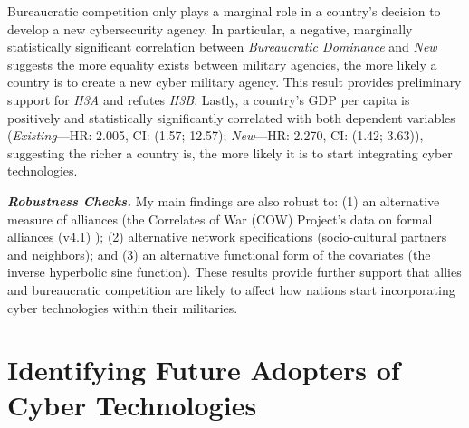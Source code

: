 \documentclass[12pt, letterpaper]{article}
\theoremstyle{plain}
\theoremstyle{remark}
\begin{document}


Bureaucratic competition only plays a marginal role in a country's decision to develop a new cybersecurity agency.
In particular, a negative, marginally statistically significant correlation between \textit{Bureaucratic Dominance} and \textit{New} suggests the more equality exists between military agencies, the more likely a country is to create a new cyber military agency. This result provides preliminary support for \textit{H3A} and refutes \textit{H3B}. 
Lastly, a country's GDP per capita is positively and statistically significantly correlated with both dependent variables (\textit{Existing}---HR: 2.005, CI: (1.57; 12.57); \textit{New}---HR: 2.270, CI: (1.42; 3.63)), suggesting the richer a country is, the more likely it is to start integrating cyber technologies. 


\vspace{3mm}

\noindent
\textbf{\textit{Robustness Checks.}}
My main findings are also robust to:
(1) an alternative measure of alliances (the Correlates of War (COW) Project's data on formal alliances (v4.1) \citep{gibler2008international}); 
(2) alternative network specifications (socio-cultural partners and neighbors); and 
(3) an alternative functional form of the covariates (the inverse hyperbolic sine function). 
These results provide further support that allies and bureaucratic competition are likely to affect how nations start incorporating cyber technologies within their militaries.



\section*{Identifying Future Adopters of Cyber Technologies}\label{sec:predictions}
\end{document}
